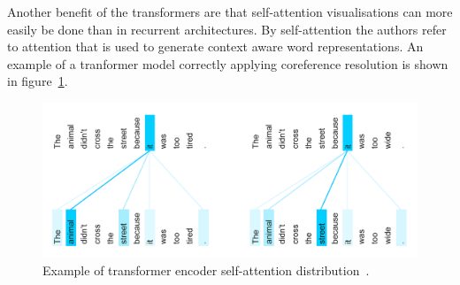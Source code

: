 Another benefit of the transformers are that self-attention visualisations can more easily be done than in recurrent architectures.
By self-attention the authors refer to attention that is used to generate context aware word representations.
An example of a tranformer model correctly applying coreference resolution is shown in figure~\ref{fig:coreference_resolution}.

\begin{figure}[htbp]
    \begin{center}
        \includegraphics[width=\textwidth]{figures/coreference_resolution.png}
    \end{center}
    \caption{Example of transformer encoder self-attention distribution~\citep{uszkoreit2017}.}
    \label{fig:coreference_resolution}
\end{figure}

